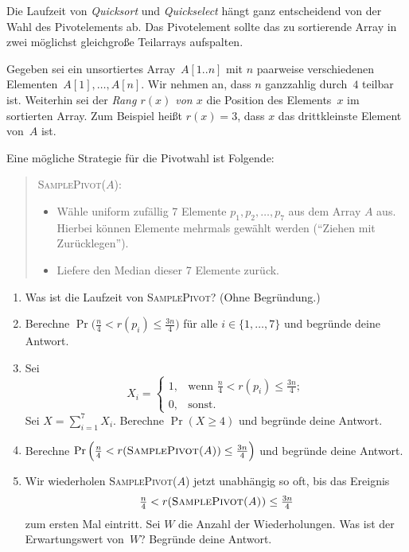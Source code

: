 \documentclass{uebung_cs}
\begin{document}
\begin{exercise}
	Die Laufzeit von \textit{Quicksort} und \textit{Quickselect} hängt ganz entscheidend von der Wahl des Pivotelements ab.
	Das Pivotelement sollte das zu sortierende Array in zwei möglichst gleichgroße Teilarrays aufspalten.

	Gegeben sei ein unsortiertes Array~$A[1..n]$ mit $n$ paarweise verschiedenen Elementen~$A[1], \dots, A[n]$. Wir nehmen an, dass $n$ ganzzahlig durch~$4$ teilbar ist.
	Weiterhin sei der \emph{Rang $r(x)$ von $x$} die Position des Elements~$x$ im sortierten Array. Zum Beispiel heißt $r(x)=3$, dass $x$ das drittkleinste Element von~$A$ ist.

	Eine mögliche Strategie für die Pivotwahl ist Folgende:

	\begin{quote}
		\textsc{SamplePivot($A$):}
		\begin{itemize}
			\item Wähle uniform zufällig 7 Elemente $p_1,p_2,\dots,p_7$ aus dem Array $A$ aus. Hierbei können Elemente mehrmals gewählt werden (\enquote{Ziehen mit Zurücklegen}).
			\item Liefere den Median dieser 7 Elemente zurück.
		\end{itemize}
	\end{quote}
	\begin{enumerate}
		\item Was ist die Laufzeit von \textsc{SamplePivot}? (Ohne Begründung.)
		\item Berechne $\Pr\Big(\frac{n}{4}<r(p_i)\le\frac{3n}{4}\Big)$ für alle $i\in\{1,\dots,7\}$ und begründe deine Antwort.
		\item Sei
		\[X_i=
		\begin{cases}
			1,&\text{wenn }
			\frac{n}{4}<r(p_i)\le\frac{3n}{4};\\
			0,&\text{sonst.}
		\end{cases}
		\]
		Sei $X=\sum_{i=1}^7 X_i$.
		Berechne $\Pr\left(X\ge 4\right)$ und begründe deine Antwort.
		\item Berechne $\Pr\Big(\frac{n}{4}<r(\text{\textsc{SamplePivot($A$)}})\le\frac{3n}{4}\Big)$ und begründe deine Antwort.
		\item Wir wiederholen \textsc{SamplePivot($A$)} jetzt unabhängig so oft, bis das Ereignis \[\tfrac{n}{4}<r(\text{\textsc{SamplePivot($A$))}}\le\tfrac{3n}{4}\] zum ersten Mal eintritt. Sei $W$ die Anzahl der Wiederholungen. Was ist der Erwartungswert von~$W$? Begründe deine Antwort.
	\end{enumerate}
\end{exercise}
\end{document}
